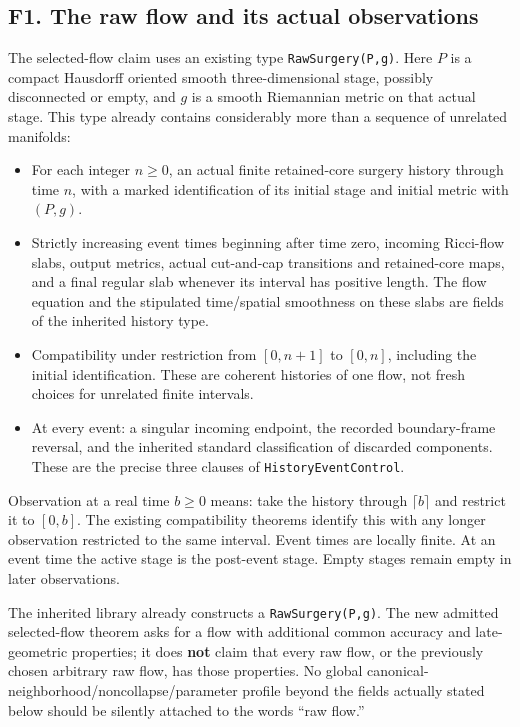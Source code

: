 \documentclass[
  letterpaper,
  11pt]{article}
\providecommand{\tightlist}{%
  \setlength{\itemsep}{0pt}\setlength{\parskip}{0pt}}
\begin{document}
\subsection{F1. The raw flow and its actual
observations}\label{f1-raw-flow}

The selected-flow claim uses an existing type
{\small\texttt{Raw\allowbreak{}Surgery(P,g)}}. Here \(P\) is a compact
Hausdorff oriented smooth three-dimensional stage, possibly disconnected
or empty, and \(g\) is a smooth Riemannian metric on that actual stage.
This type already contains considerably more than a sequence of
unrelated manifolds:

\begin{itemize}
\tightlist
\item
  For each integer \(n\geq0\), an actual finite retained-core surgery
  history through time \(n\), with a marked identification of its
  initial stage and initial metric with \((P,g)\).
\item
  Strictly increasing event times beginning after time zero, incoming
  Ricci-flow slabs, output metrics, actual cut-and-cap transitions and
  retained-core maps, and a final regular slab whenever its interval has
  positive length. The flow equation and the stipulated time/spatial
  smoothness on these slabs are fields of the inherited history type.
\item
  Compatibility under restriction from \([0,n+1]\) to \([0,n]\),
  including the initial identification. These are coherent histories of
  one flow, not fresh choices for unrelated finite intervals.
\item
  At every event: a singular incoming endpoint, the recorded
  boundary-frame reversal, and the inherited standard classification of
  discarded components. These are the precise three clauses of
  {\small\texttt{History\allowbreak{}Event\allowbreak{}Control}}.
\end{itemize}

Observation at a real time \(b\geq0\) means: take the history through
\(\lceil b\rceil\) and restrict it to \([0,b]\). The existing
compatibility theorems identify this with any longer observation
restricted to the same interval. Event times are locally finite. At an
event time the active stage is the post-event stage. Empty stages remain
empty in later observations.

The inherited library already constructs a
{\small\texttt{Raw\allowbreak{}Surgery(P,g)}}. The new admitted
selected-flow theorem asks for a flow with additional common accuracy
and late-geometric properties; it does \textbf{not} claim that every raw
flow, or the previously chosen arbitrary raw flow, has those properties.
No global canonical-neighborhood/noncollapse/parameter profile beyond
the fields actually stated below should be silently attached to the
words ``raw flow.''
\end{document}
